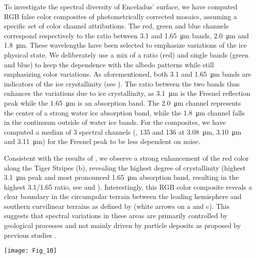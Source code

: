 \documentclass{arxiv-icarus}
\begin{document}
To investigate the spectral diversity of Enceladus' surface, we have computed RGB false color composites of photometrically corrected mosaics, assuming a specific set of color channel attributions. The red, green and blue channels correspond respectively to the ratio between 3.1 and \SI{1.65}{\um} bands, \SI{2.0}{\um} and \SI{1.8}{\um}. These wavelengths have been selected to emphasize variations of the ice physical state. We deliberately use a mix of a ratio (red) and single bands (green and blue) to keep the dependence with the albedo patterns while still emphasizing color variations. As aforementioned, both \num{3.1} and \SI{1.65}{\um} bands are indicators of the ice crystallinity (see ). The ratio between the two bands thus enhances the variations due to ice crystallinity, as \SI{3.1}{\um} is the Fresnel reflection peak while the \SI{1.65}{\um} is an absorption band. The \SI{2.0}{\um} channel represents the center of a strong water ice absorption band, while the \SI{1.8}{\um} channel falls in the continuum outside of water ice bands. For the composites, we have computed a median of 3 spectral channels (, 135 and 136 at \SI{3.08}{\um}, \SI{3.10}{\um} and \SI{3.11}{\um}) for the Fresnel peak to be less dependent on noise.

Consistent with the results of \cite{Brown2006}, we observe a strong enhancement of the red color along the Tiger Stripes (b), revealing the highest degree of crystallinity (highest \SI{3.1}{\um} peak and most pronounced \SI{1.65}{\um} absorption band, resulting in the highest \num{3.1/1.65} ratio, see  and ). Interestingly, this RGB color composite reveals a clear boundary in the circumpolar terrain between the leading hemisphere and southern curvilinear terrains as defined by \cite{Crow-Willard2015} (white arrows on a and c). This suggests that spectral variations in these areas are primarily controlled by geological processes and not mainly driven by particle deposits as proposed by previous studies \citep{Schenk2011, Scipioni2017}.


\begin{figure*}[!ht]
    \vspace{.2cm}
    \texttt{[image: Fig\_10]}
    \caption{RGB global map in equirectangular projection with the red, green and blue channels controlled by the \SI{3.1/1.65}{\um} ratio, \SI{2.0}{\um} and \SI{1.8}{\um} channels respectively. The black dashed line rectangle corresponds to an area discussed in .}
    \label{fig:fig_10}
\end{figure*}
\end{document}
